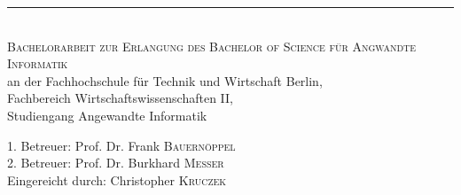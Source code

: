 \begin{titlepage}
	\begin{center}
		\vspace*{2 cm}
		\textsc{\LARGE \mytitle}
		\rule{\textwidth}{0.4pt} \\[1.5cm]
		\textsc{\Large Bachelorarbeit zur Erlangung des Bachelor of Science f\"ur Angwandte Informatik}\\[1.5cm]
			
			an der Fachhochschule für Technik und Wirtschaft Berlin,\\
Fachbereich Wirtschaftswissenschaften II,\\
Studiengang Angewandte Informatik\\[1cm]			
		\vspace{3cm}
	\end{center}
	\begin{flushleft}
		1. Betreuer: \hfill Prof. Dr. Frank \textsc{Bauern\"oppel}\\
		2. Betreuer: \hfill Prof. Dr. Burkhard \textsc{Messer}\\[2cm]
		Eingereicht durch: \hfill Christopher \textsc{Kruczek}		
	\end{flushleft}
	
	\vfill
	\center {\large \today}
\end{titlepage}